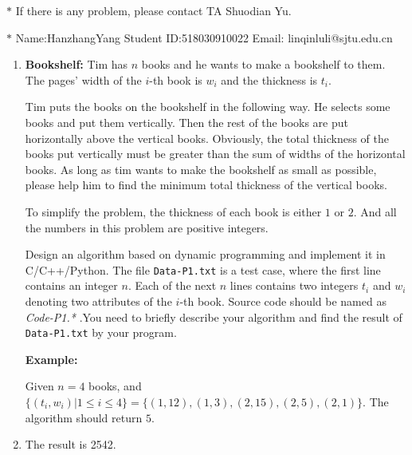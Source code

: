 \documentclass[12pt,a4paper]{article}
\makeatletter
\newtheorem*{solution}{Solution}
\theoremstyle{definition}
\renewenvironment{solution}[1][Solution] {\par\pushQED{\qed}\normalfont\topsep6\p@\@plus6\p@\relax\trivlist\item[\hskip\labelsep\bfseries#1\@addpunct{.}]\ignorespaces}{\popQED\endtrivlist\@endpefalse} \makeatother
\makeatother
\begin{document}
\noindent

\noindent{}
\begin{center}
\footnotesize{\color{red}$*$ If there is any problem, please contact TA Shuodian Yu.}

\footnotesize{\color{blue}$*$ Name:HanzhangYang  \quad Student ID:518030910022 \quad Email: linqinluli@sjtu.edu.cn}
\end{center}

\begin{enumerate}
    \item
    \textbf{Bookshelf: }Tim has $n$ books and he wants to make a bookshelf to them. The pages' width of the $i$-th book is $w_i$ and the thickness is $t_i$. 

    Tim puts the books on the bookshelf in the following way. He selects some books and put them vertically. Then the rest of the books are put horizontally above the vertical books. Obviously, the total thickness of the books put vertically must be greater than the sum of widths of the horizontal books. As long as tim wants to make the bookshelf as small as possible, please help him to find the minimum total thickness of the vertical books.

    To simplify the problem, the thickness of each book is either $1$ or $2$. And all the numbers in this problem are positive integers.

    Design an algorithm based on dynamic programming and implement it in C/C++/Python. The file \texttt{Data-P1.txt} is a test case, where the first line contains an integer $n$. Each of the next $n$ lines contains two integers $t_i$ and $w_i$ denoting two attributes of the $i$-th book. Source code should be named as
    {\color{red}\emph{Code-P1.*}} .You need to briefly describe your algorithm and find the result of \texttt{Data-P1.txt} by your program.

    \textbf{Example:}

    Given $n=4$ books, and $\{(t_i,w_i)|1\leq i \leq 4\} = \{(1,12),(1,3),(2,15),(2,5),(2,1)\}$. The algorithm should return $5$.

    \begin{solution}
       The result is 2542. 


\end{solution}
\end{enumerate}
\end{document}
